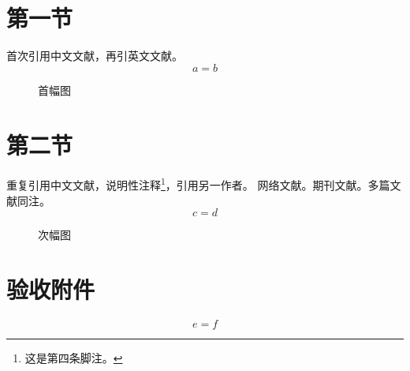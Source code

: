 \documentclass{cuebthesis}
\begin{document}
\cuebfrontmatter
{}
\section{第一节}
首次引用中文文献，再引英文文献。
\begin{equation} a=b \label{eq:first}\end{equation}
\begin{figure}[ht]\centering{}\caption{首幅图}\label{fig:first}\end{figure}
\clearpage
\section{第二节}
重复引用中文文献，说明性注释\footnote{这是第四条脚注。}，引用另一作者。
网络文献。期刊文献。多篇文献同注。
\begin{equation} c=d \label{eq:second}\end{equation}
\begin{figure}[ht]\centering{}\caption{次幅图}\label{fig:second}\end{figure}
\cuebprintbibliography
\cuebappendix
\section{验收附件}
\begin{equation}e=f\label{eq:appendix}\end{equation}
\end{document}
